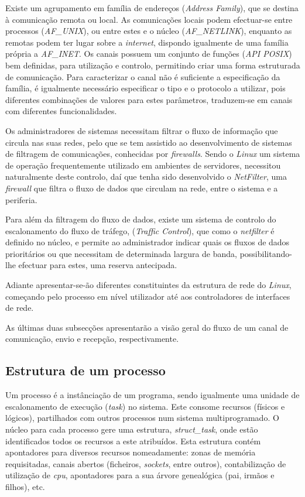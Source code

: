 Existe um agrupamento em família de endereços (\textit{Address Family}), que se destina à comunicação remota ou local.
As comunicações locais podem efectuar-se entre processos (\textit{AF\_UNIX}), ou entre estes e o núcleo (\textit{AF\_NETLINK}), enquanto as remotas podem ter lugar sobre a \textit{internet}, dispondo igualmente de uma família própria a \textit{AF\_INET}.
Os canais possuem um conjunto de funções (\textit{API POSIX}) bem definidas, para utilização e controlo, permitindo criar uma forma estruturada de comunicação.
Para caracterizar o canal não é suficiente a especificação da família, é igualmente necessário especificar o tipo e o protocolo a utilizar, pois diferentes combinações de valores para estes parâmetros, traduzem-se em canais com diferentes funcionalidades.

Os administradores de sistemas necessitam filtrar o fluxo de informação que circula nas suas redes, pelo que se tem assistido ao desenvolvimento de sistemas de filtragem de comunicações, conhecidas por \textit{firewalls}.
Sendo o \textit{Linux} um sistema de operação frequentemente utilizado em ambientes de servidores, necessitou naturalmente deste controlo, daí que tenha sido desenvolvido o \textit{NetFilter}, uma \textit{firewall} que \color{red}filtra \color{black}o fluxo de dados que circulam na rede, entre o sistema e a periferia.

Para além da filtragem do fluxo de dados, existe um sistema de controlo do escalonamento do fluxo de tráfego, (\textit{Traffic Control}), que como o \textit{netfilter} é definido no núcleo, e permite ao administrador indicar quais os fluxos de dados prioritários ou que necessitam de determinada largura de banda, possibilitando-lhe efectuar para estes, uma reserva antecipada.
 
Adiante apresentar-se-ão diferentes constituintes da estrutura de rede do \textit{Linux}, começando pelo processo em nível utilizador até aos controladores de interfaces de rede.

\color{red}As últimas duas subsecções apresentarão a visão geral do fluxo de um canal de comunicação, envio e recepção, respectivamente.\color{black}

\subsection{Estrutura de um processo}

Um processo é a instânciação de um programa, sendo igualmente uma unidade de escalonamento de execução (\textit{task}) no sistema.
Este consome recursos (físicos e lógicos), partilhados com outros processos num sistema multiprogramado.
O núcleo para cada processo gere uma estrutura, \textit{struct\_task}, onde estão identificados todos os recursos a este atribuídos.
Esta estrutura contém apontadores para diversos recursos nomeadamente: zonas de memória requisitadas, canais abertos (ficheiros, \textit{sockets}, entre outros), contabilização de utilização de \textit{cpu}, apontadores para a sua árvore genealógica (pai, irmãos e filhos), etc.

